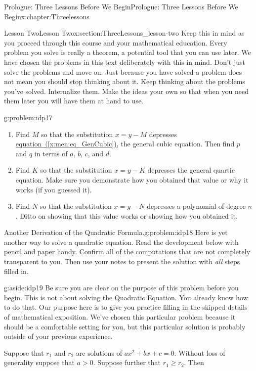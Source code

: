 \documentclass[oneside,10pt,]{book}
\newcommand{\xreffont}{\relax}
\numberwithin{equation}{section}
\begin{document}
\begin{chapterptx}{Prologue: Three Lessons Before We Begin}{}{Prologue: Three Lessons Before We Begin}{}{}{x:chapter:Threelessons}
\begin{sectionptx}{Lesson Two}{}{Lesson Two}{}{}{x:section:ThreeLessons_lesson-two}
Keep this in mind as you proceed through this course and your mathematical education. Every problem you solve is really a theorem, a potential tool that you can use later. We have chosen the problems in this text deliberately with this in mind. Don't just solve the problems and move on. Just because you have solved a problem does not mean you should stop thinking about it. Keep thinking about the problems you've solved. Internalize them. Make the ideas your own so that when you need them later you will have them at hand to use.%
\begin{problem}{}{g:problem:idp17}%
%
\begin{enumerate}[label=(\alph*)]
\item{}Find \(M\) so that the substitution \(x=y-M\) depresses \hyperref[x:men:eq_GenCubic]{equation~({\xreffont\ref{x:men:eq_GenCubic}})}, the general cubic equation. Then find \(p\) and \(q\) in terms of \(a\), \(b\), \(c\), and \(d\).%
\item{}Find \(K\) so that the substitution \(x=y-K\) depresses the general quartic equation. Make sure you demonstrate how you obtained that value or why it works (if you guessed it).%
\item{}Find \(N\) so that the substitution \(x=y-N\) depresses a polynomial of degree \(n\). Ditto on showing that this value works or showing how you obtained it.%
\end{enumerate}
%
\end{problem}
\begin{problem}{Another Derivation of the Quadratic Formula.}{g:problem:idp18}%
 Here is yet another way to solve a quadratic equation. Read the development below with pencil and paper handy. Confirm all of the computations that are not completely transparent to you. Then use your notes to present the solution with \emph{all} steps filled in.%
\begin{aside}{}{g:aside:idp19}%
Be sure you are clear on the purpose of this problem before you begin. This is not about solving the Quadratic Equation. You already know how to do that. Our purpose here is to give you practice filling in the skipped details of mathematical exposition. We've chosen this particular problem because it should be a comfortable setting for you, but this particular solution is probably outside of your previous experience.%
\end{aside}
Suppose that \(r_1\) and \(r_2\) are solutions of \(ax^2+bx+c=0\). Without loss of generality suppose that \(a>0\).  Suppose further that \(r_1\ge r_2\).  Then%

\end{problem}
\end{sectionptx}
\end{chapterptx}
\end{document}
